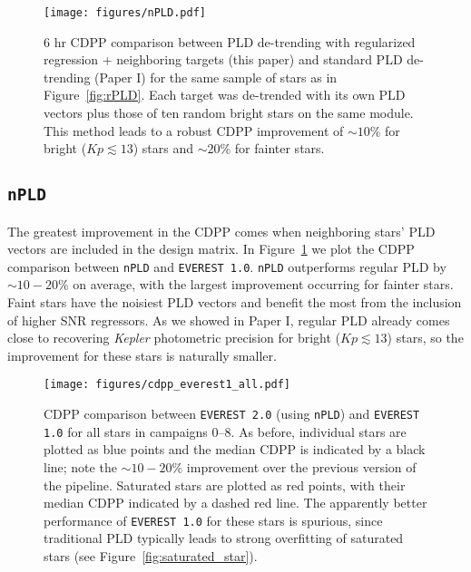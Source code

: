\documentclass[]{aastex62}
\newcommand{\Kp}{\ensuremath{Kp}}
\begin{document}
\begin{figure}[hbt]
  \begin{center}
      \texttt{[image: figures/nPLD.pdf]}
       \caption{6 hr CDPP comparison between PLD de-trending with regularized regression + neighboring targets
                (this paper) and standard PLD de-trending (Paper I) for the same sample of stars as in Figure~\ref{fig:rPLD}.
                Each target was de-trended with its own PLD vectors plus those of ten random bright stars
                on the same module. This method leads to a robust CDPP improvement of ${\sim}10$\% for bright ($\Kp \lesssim 13$) stars
                and ${\sim}20$\% for fainter stars.}
     \label{fig:nPLD}
  \end{center}
\end{figure}

\subsection{\texttt{nPLD}}
The greatest improvement in the CDPP comes when neighboring stars' PLD vectors are included
in the design matrix. In Figure~\ref{fig:nPLD} we plot the CDPP comparison between \texttt{nPLD}
and \texttt{EVEREST 1.0}. \texttt{nPLD} outperforms regular PLD by ${\sim}10-20\%$
on average, with the largest improvement occurring for fainter stars. Faint stars have the
noisiest PLD vectors and benefit the most from the inclusion of higher SNR regressors.
As we showed in Paper I, regular PLD already comes close to recovering \emph{Kepler} photometric
precision for bright ($\Kp \lesssim 13$) stars, so the improvement for these stars is naturally
smaller.\\[0em]

\begin{figure}[hbt]
  \begin{center}
      \texttt{[image: figures/cdpp\_everest1\_all.pdf]}
       \caption{CDPP comparison between \texttt{EVEREST 2.0} (using \texttt{nPLD}) and \texttt{EVEREST 1.0} for all stars in campaigns 0--8.
       As before, individual stars are plotted as blue points and the median CDPP is indicated by a black line; note
       the ${\sim}10-20$\% improvement over the previous version of the pipeline. Saturated
       stars are plotted as red points, with their median CDPP indicated by a dashed red line. The apparently
       better performance of \texttt{EVEREST 1.0} for these stars is spurious, since traditional PLD typically
       leads to strong overfitting of saturated stars (see Figure~\ref{fig:saturated_star}).}
     \label{fig:cdpp_everest1_all}
  \end{center}
\end{figure}
\end{document}
